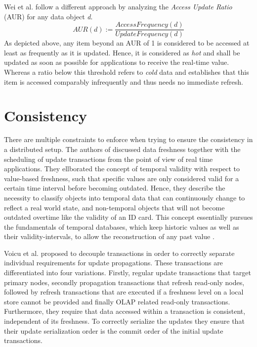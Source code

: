 Wei et al. \cite{wei:2004} follow a different approach by analyzing the \emph{Access Update Ratio} (AUR) for any data object \textit{d}. 
\begin{equation}
AUR(d) := \frac{AccessFrequency(d)}{UpdateFrequency(d)}
\end{equation}
As depicted above, any item beyond an AUR of 1 is considered to be accessed at least as frequently as it is updated.
Hence, it is considered as \emph{hot} and shall be updated as soon as possible for applications to receive the real-time value. 
Whereas a ratio below this threshold refers to \emph{cold} data and establishes that this item is accessed comparably infrequently and thus needs no immediate refresh. 






\section{Consistency}
\label{sec:consistency}
There are multiple constraints to enforce when trying to ensure the consistency in a distributed setup.
The authors of \cite{wei:2004, xiang:2008} discussed data freshness together with the scheduling of update transactions from the 
point of view of real time applications. They ellborated the concept of temporal validity with respect to value-based freshness,
such that specific values are only considered valid for a certain time interval before becoming outdated. Hence, they describe the necessity to classify objects into
temporal data that can continuously change to reflect a real world state, and non-temporal objects that will not become outdated overtime like the validity of an ID card.
This concept essentially pursues the fundamentals of temporal databases, which keep historic values as well as their validity-intervals, to allow the reconstruction of any 
past value \cite{etzion:1998}. 

Voicu et al. \cite{voicu:2010} proposed to decouple transactions in order to correctly separate individual requirements for update propagations.
These transactions are differentiated into four variations. Firstly, regular update transactions that target primary nodes, secondly propagation transactions 
that refresh read-only nodes, followed by refresh transactions that are executed if a freshness level on a local store cannot be provided and 
finally OLAP related read-only transactions.
Furthermore, they require that data accessed within a transaction is consistent, independent of its freshness. To correctly serialize the updates
they ensure that their update serialization order is the commit order of the initial update transactions.\\

